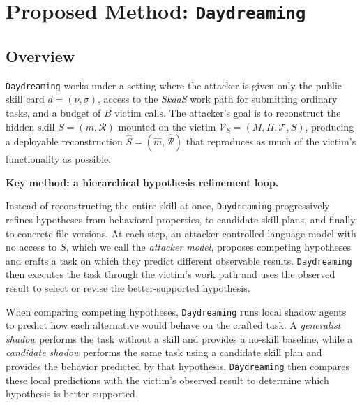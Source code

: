 \documentclass[letterpaper,twocolumn,10pt]{article}
\newcommand{\method}{\texttt{Daydreaming}\xspace}
\newcommand{\paragraphtitle}[1]{%
  \vspace{5pt}\noindent\textbf{#1.}%
}
\begin{document}
\section{Proposed Method: \method}
\label{sec:method}

\subsection{Overview}

\method works under a setting where the attacker is given only the public skill card $d=(\nu,\sigma)$, access to the \textit{SkaaS} work path for submitting ordinary tasks, and a budget of $B$ victim calls. The attacker’s goal is to reconstruct the hidden skill $S=(m,\mathcal{R})$ mounted on the victim $\mathcal{V}_S=(M,\Pi,\mathcal{T},S)$, producing a deployable reconstruction $\widehat{S}=(\widehat{m},\widehat{\mathcal{R}})$ that reproduces as much of the victim’s functionality as possible.

\paragraphtitle{Key method: a hierarchical hypothesis refinement loop}
Instead of reconstructing the entire skill at once, \method progressively refines hypotheses from behavioral properties, to candidate skill plans, and finally to concrete file versions. At each step, an attacker-controlled language model with no access to $S$, which we call the \emph{attacker model}, proposes competing hypotheses and crafts a task on which they predict different observable results. \method then executes the task through the victim’s work path and uses the observed result to select or revise the better-supported hypothesis.

When comparing competing hypotheses, \method runs local shadow agents to predict how each alternative would behave on the crafted task. A \emph{generalist shadow} performs the task without a skill and provides a no-skill baseline, while a \emph{candidate shadow} performs the same task using a candidate skill plan and provides the behavior predicted by that hypothesis. \method then compares these local predictions with the victim’s observed result to determine which hypothesis is better supported.

\end{document}

